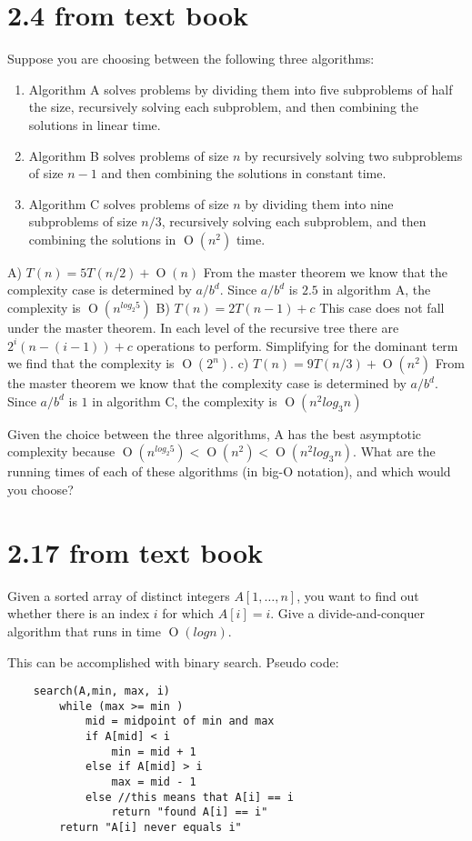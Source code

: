 \documentclass[12pt]{article}
\newcommand{\BigO}[1]{\ensuremath{\operatorname{O}\left(#1\right)}}
\begin{document}
\section*{2.4 from text book}
Suppose you are choosing between the following three algorithms:

\begin{enumerate}
\item Algorithm A solves problems by dividing them into five subproblems
of half the size, recursively solving each subproblem, and then
combining the solutions in linear time.

\item Algorithm B solves problems of size $n$ by recursively solving two
subproblems of size $n−1$ and then combining the solutions in constant
time.

\item Algorithm C solves problems of size $n$ by dividing them into nine
subproblems of size $n/3$, recursively solving each subproblem, and then
combining the solutions in $\BigO{n^2}$ time.
\end{enumerate}

A) $T(n) = 5T(n/2) + \BigO{n}$
	From the master theorem we know that the complexity case is determined by $a/b^{d}$.  Since $a/b^{d}$ is $2.5$ in algorithm A, the complexity is $\BigO{n^{log_2 5}}$
B) $T(n) = 2T(n-1) + c$
	This case does not fall under the master theorem.  In each level of the	recursive tree there are $2^{i}(n-(i-1)) +c$ operations to perform.  Simplifying for the dominant term we find that the complexity is $\BigO{2^{n}}$.
c) $T(n) = 9T(n/3) + \BigO{n^2}$
	From the master theorem we know that the complexity case is determined by $a/b^{d}$.  Since $a/b^{d}$ is $1$ in algorithm C, the complexity is $\BigO{n^{2}log_3 n}$

Given the choice between the three algorithms, A has the best asymptotic
complexity because $\BigO{n^{log_2 5}} < \BigO{n^{2}} < \BigO{n^{2}log_3 n}$.
\noindent What are the running times of each of these algorithms (in big-O
notation), and which would you choose?

\section*{2.17 from text book}

Given a sorted array of distinct integers $A[1, \dots , n]$, you want to
find out whether there is an index $i$ for which $A[i] = i$. Give a
divide-and-conquer algorithm that runs in time $\BigO{log n}$.

This can be accomplished with binary search.
Pseudo code:
\begin{verbatim}
	search(A,min, max, i)
		while (max >= min )
			mid = midpoint of min and max
			if A[mid] < i
				min = mid + 1
			else if A[mid] > i
				max = mid - 1
			else //this means that A[i] == i
				return "found A[i] == i"
		return "A[i] never equals i"
\end{verbatim}
\end{document}
